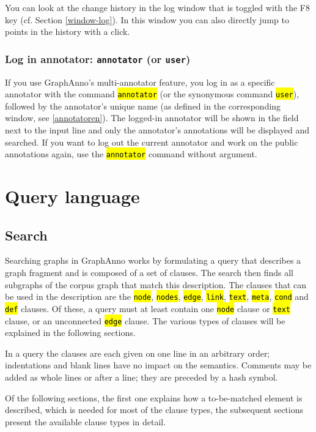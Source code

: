 \documentclass[12pt]{scrartcl}
\newcommand{\code}[1]{\hl{\texttt{#1}}}
\begin{document}
You can look at the change history in the log window that is toggled with the F8 key (cf. Section \ref{window-log}).
In this window you can also directly jump to points in the history with a click.


\subsubsection{Log in annotator: \texttt{annotator} (or \texttt{user})}

If you use GraphAnno’s multi-annotator feature, you log in as a specific annotator with the command \code{annotator} (or the synonymous command \code{user}), followed by the annotator’s unique name (as defined in the corresponding window, see \ref{annotatoren}).
The logged-in annotator will be shown in the field next to the input line and only the annotator’s annotations will be displayed and searched.
If you want to log out the current annotator and work on the public annotations again, use the \code{annotator} command without argument.



\section{Query language}\label{querylanguage}

\subsection{Search}

Searching graphs in GraphAnno works by formulating a query that describes a graph fragment and is composed of a set of clauses.
The search then finds all subgraphs of the corpus graph that match this description.
The clauses that can be used in the description are the \code{node}, \code{nodes}, \code{edge}, \code{link}, \code{text}, \code{meta}, \code{cond} and \code{def} clauses.
Of these, a query must at least contain one \code{node} clause or \code{text} clause, or an unconnected \code{edge} clause.
The various types of clauses will be explained in the following sections.

In a query the clauses are each given on one line in an arbitrary order; indentations and blank lines have no impact on the semantics.
Comments may be added as whole lines or after a line; they are preceded by a hash symbol.

Of the following sections, the first one explains how a to-be-matched element is described, which is needed for most of the clause types, the subsequent sections present the available clause types in detail.
\end{document}
